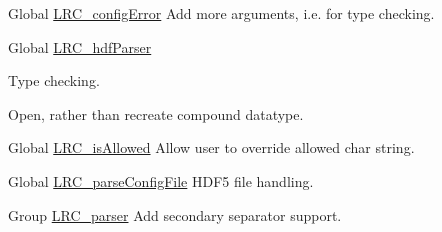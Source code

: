 \label{todo__todo000001}
\hypertarget{todo__todo000001}{}
 
\begin{DoxyDescription}
\item[Global \hyperlink{group___l_r_c__internals_ga0768167abe6a143840f26439a86ec79d}{LRC\_\-configError} ]Add more arguments, i.e. for type checking.


\end{DoxyDescription}

\label{todo__todo000005}
\hypertarget{todo__todo000005}{}
 
\begin{DoxyDescription}
\item[Global \hyperlink{group___l_r_c__parser_ga3cbf6e172a98da00ec8fd0b301b4b8f9}{LRC\_\-hdfParser} ]
\begin{DoxyItemize}
\item Type checking.
\item Open, rather than recreate compound datatype.
\end{DoxyItemize}


\end{DoxyDescription}

\label{todo__todo000002}
\hypertarget{todo__todo000002}{}
 
\begin{DoxyDescription}
\item[Global \hyperlink{group___l_r_c__internals_ga6ac7bc617b346047519f4c3589a311bd}{LRC\_\-isAllowed} ]Allow user to override allowed char string. 
\end{DoxyDescription}

\label{todo__todo000008}
\hypertarget{todo__todo000008}{}
 
\begin{DoxyDescription}
\item[Global \hyperlink{group___l_r_c__wrappers_ga98adf1a77ae325830d4521b691ca33b0}{LRC\_\-parseConfigFile} ]HDF5 file handling. 
\end{DoxyDescription}

\label{todo__todo000003}
\hypertarget{todo__todo000003}{}
 
\begin{DoxyDescription}
\item[Group \hyperlink{group___l_r_c__parser}{LRC\_\-parser} ]Add secondary separator support. 
\end{DoxyDescription}

\label{todo__todo000004}
\hypertarget{todo__todo000004}{}
 
